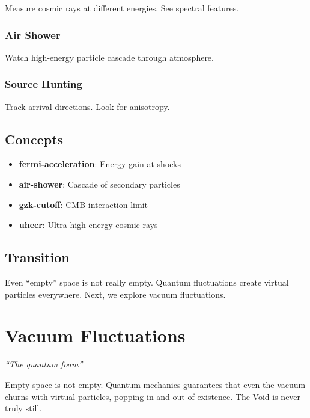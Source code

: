 \documentclass[
  11pt,
  letterpaper,
  twoside,
  openright]{book}
\providecommand{\tightlist}{%
  \setlength{\itemsep}{0pt}\setlength{\parskip}{0pt}}
\begin{document}
Measure cosmic rays at different energies. See spectral features.

\subsection{Air Shower}\label{air-shower}

Watch high-energy particle cascade through atmosphere.

\subsection{Source Hunting}\label{source-hunting}

Track arrival directions. Look for anisotropy.

\section{Concepts}\label{concepts-34}

\begin{itemize}
\tightlist
\item
  \textbf{fermi-acceleration}: Energy gain at shocks
\item
  \textbf{air-shower}: Cascade of secondary particles
\item
  \textbf{gzk-cutoff}: CMB interaction limit
\item
  \textbf{uhecr}: Ultra-high energy cosmic rays
\end{itemize}

\section{Transition}\label{transition-35}

Even ``empty'' space is not really empty. Quantum fluctuations create
virtual particles everywhere. Next, we explore vacuum fluctuations.

\chapter{Vacuum Fluctuations}\label{sec-vacuum-fluctuations}

\emph{``The quantum foam''}

\begin{tcolorbox}[enhanced jigsaw, leftrule=.75mm, title=\textcolor{quarto-callout-note-color}{\faInfo}\hspace{0.5em}{Key Revelation}, bottomrule=.15mm, opacityback=0, coltitle=black, arc=.35mm, colframe=quarto-callout-note-color-frame, colbacktitle=quarto-callout-note-color!10!white, colback=white, titlerule=0mm, breakable, bottomtitle=1mm, toptitle=1mm, rightrule=.15mm, toprule=.15mm, left=2mm, opacitybacktitle=0.6]

Empty space is not empty. Quantum mechanics guarantees that even the
vacuum churns with virtual particles, popping in and out of existence.
The Void is never truly still.

\end{tcolorbox}
\end{document}
